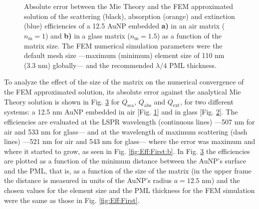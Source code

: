 %
\begin{figure}[b!]
	\centering
	\def\svgwidth{.9\textwidth}
	\small
	\vspace*{1.em}
	\hspace*{-.75\textwidth}
     \begin{subfigure}{\textwidth}\caption{}\label{fig:Eff:Matrix:a}\end{subfigure}\\[6em]
    \hspace*{-.75\textwidth}
     \begin{subfigure}{\textwidth}\caption{}\label{fig:Eff:Matrix:b}\end{subfigure}\\[-10.75em]
\caption[Scattering, Absorption and Extinction Efficiencies absolute error: Matrix size analysis ]{Absolute error between the Mie Theory and the FEM approximated solution of the scattering (black), absorption (orange) and extinction (blue) efficiencies of a 12.5 AuNP embedded \textbf{a)} in an air matrix ($n_\text{m} = 1$) and \textbf{b)} in a glass matrix ($n_\text{m} = 1.5$) as a function of the matrix size. The FEM numerical simulation parameters were the default mesh size ---maximum (minimum) element size of 110 nm (3.3 nm) globally--- and the recommended $\lambda/4$ PML thickness. }
\label{fig:Eff:Matrix}
\end{figure}
%
To analyze the effect of the size of the matrix on the numerical convergence of the FEM approximated solution, its absolute error against the analytical Mie Theory solution is shown in Fig. \ref{fig:Eff:Matrix} for $Q_\text{sca}$, $Q_\text{abs}$ and $Q_\text{ext}$, for two different systems: a 12.5 nm AuNP embedded in air [Fig. \ref{fig:Eff:Matrix:a}] and in glass [Fig. \ref{fig:Eff:Matrix:b}]. The efficiencies are evaluated at the LSPR wavelength (continuous lines) ---507 nm for air and 533 nm for glass--- and at the wavelength of maximum scattering (dash lines) ---521 nm for air and 543 nm for glass--- where the error was maximum and where it started to grow, as seen in Fig. \ref{fig:Eff:First:b}. In Fig. \ref{fig:Eff:Matrix} the efficiencies are plotted as a function of the minimum distance between the AuNP's surface and the PML, that is, as a function of the size of the matrix (in the upper frame the distance is measured in units of the AuNP's radius $a=12.5$ nm) and the chosen values for the element size and the PML thickness for the FEM simulation were the same as those in Fig. \ref{fig:Eff:First}.

